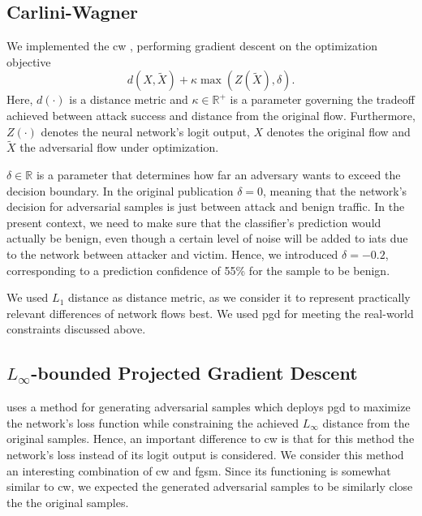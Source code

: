 \documentclass[conference]{IEEEtran}
\begin{document}
\subsection{Carlini-Wagner}
We implemented the \gls{cw} \cite{carlini_towards_2017}, performing gradient descent on the optimization objective
\begin{equation} \label{eq:carliniWagner}
d(X,\tilde X) + \kappa  \max(Z(\tilde X), \delta).
\end{equation}
Here, $d(\cdot)$ is a distance metric and $\kappa \in \mathbb R^+$ is a parameter governing the tradeoff achieved between attack success and distance from the original flow. Furthermore, $Z(\cdot)$ denotes the neural network's logit output, $X$ denotes the original flow and $\tilde X$ the adversarial flow under optimization.

$\delta \in \mathbb R$ is a parameter that determines how far an adversary wants to exceed the decision boundary.
In the original publication $\delta=0$, meaning that the network's decision for adversarial samples is just between attack and benign traffic. In the present context, we need to make sure that the classifier's prediction would actually be benign, even though a certain level of noise will be added to \glspl{iat} due to the network between attacker and victim. Hence, we introduced $\delta=-0.2$, corresponding to a prediction confidence of 55\% for the sample to be benign.

We used $L_1$ distance as distance metric, as we consider it to represent practically relevant differences of network flows best. We used \gls{pgd} for meeting the real-world constraints discussed above.

\subsection{$L_\infty$-bounded Projected Gradient Descent}
\cite{madry_towards_2018} uses a method for generating adversarial samples which deploys \gls{pgd}  to maximize the network's loss function while constraining the achieved $L_\infty$ distance from the original samples. Hence, an important difference to \gls{cw} is that for this method the network's loss instead of its logit output is considered.
We consider this method an interesting combination of \gls{cw} and \gls{fgsm}.
Since its functioning is somewhat similar to \gls{cw}, we expected the generated adversarial samples to be similarly close the the original samples.
\end{document}
